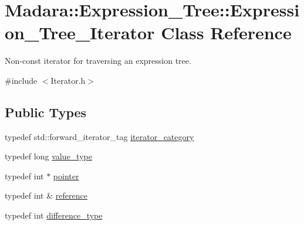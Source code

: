 \hypertarget{classMadara_1_1Expression__Tree_1_1Expression__Tree__Iterator}{
\section{Madara::Expression\_\-Tree::Expression\_\-Tree\_\-Iterator Class Reference}
\label{d2/d83/classMadara_1_1Expression__Tree_1_1Expression__Tree__Iterator}
}


Non-\/const iterator for traversing an expression tree.  




{\ttfamily \#include $<$Iterator.h$>$}

\subsection*{Public Types}
\begin{DoxyCompactItemize}
\item 
typedef std::forward\_\-iterator\_\-tag \hyperlink{classMadara_1_1Expression__Tree_1_1Expression__Tree__Iterator_aa573fce576caef4290f0b8d3719dcac1}{iterator\_\-category}
\item 
typedef long \hyperlink{classMadara_1_1Expression__Tree_1_1Expression__Tree__Iterator_abd8df8a3b61fd2efd3597d217cd1d526}{value\_\-type}
\item 
typedef int $\ast$ \hyperlink{classMadara_1_1Expression__Tree_1_1Expression__Tree__Iterator_a00e18daf5f2eb499896745ec95fb205e}{pointer}
\item 
typedef int \& \hyperlink{classMadara_1_1Expression__Tree_1_1Expression__Tree__Iterator_affb903c7cd4733ef3886f449d68e6024}{reference}
\item 
typedef int \hyperlink{classMadara_1_1Expression__Tree_1_1Expression__Tree__Iterator_af4d5c194cee2cdeef60ab7423e2b203e}{difference\_\-type}
\end{DoxyCompactItemize}
